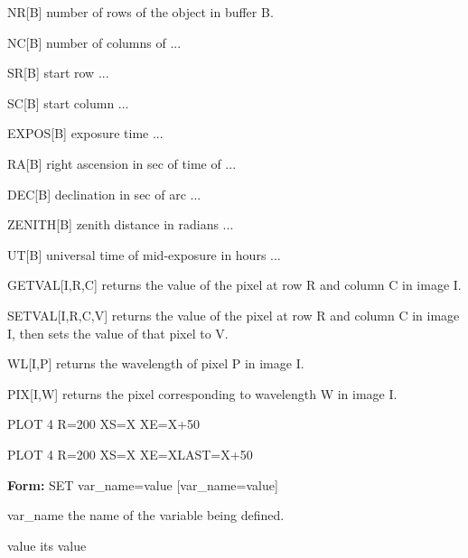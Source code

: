 {\newpage\clearpage
{}%
\begin{example}
  \item[NR{[B]}\hfill]{number of rows of the object in buffer B.}
  \item[NC{[B]}\hfill]{number of columns of ...}
  \item[SR{[B]}\hfill]{start row ...}
  \item[SC{[B]}\hfill]{start column ...}
  \item[EXPOS{[B]}\hfill]{exposure time ...}
  \item[RA{[B]}\hfill]{right ascension in sec of time of ...}
  \item[DEC{[B]}\hfill]{declination in sec of arc ...}
  \item[ZENITH{[B]}\hfill]{zenith distance in radians ...}
  \item[UT{[B]}\hfill]{universal time of mid-exposure in hours ...}
\end{example}%
\lthtmlfigureZ
\lthtmlcheckvsize\clearpage}

{\newpage\clearpage
{}%
\begin{example}
  \item[GETVAL{[I,R,C]}\hfill]{returns the value of the pixel at row R and
       column C in image I.}
  \item[SETVAL{[I,R,C,V]}\hfill]{returns the value of the pixel at row R and
       column C in image I, then sets the value of that pixel to V.}
  \item[WL{[I,P]}\hfill]{returns the wavelength of pixel P in image I.}
  \item[PIX{[I,W]}\hfill]{returns the pixel corresponding to
       wavelength W in image I.}
\end{example}%
\lthtmlfigureZ
\lthtmlcheckvsize\clearpage}

{\newpage\clearpage
{}%
\begin{hanging}
  \item{PLOT 4 R=200 XS=X XE=X+50}
\end{hanging}%
\lthtmlfigureZ
\lthtmlcheckvsize\clearpage}

{\newpage\clearpage
{}%
\begin{hanging}
  \item{PLOT 4 R=200 XS=X XE=XLAST=X+50}
\end{hanging}%
\lthtmlfigureZ
\lthtmlcheckvsize\clearpage}

{\newpage\clearpage
{}%
\begin{command}
  \item[\textbf{Form: } SET var\_name=value {[var\_name=value]}\hfill]{}
  \item[var\_name]{the name of the variable being defined.}
  \item[value]{its value}
\end{command}%
\lthtmlfigureZ
\lthtmlcheckvsize\clearpage}

